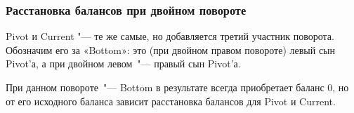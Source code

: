 \begin{frame}
    \frametitle{Расстановка балансов при двойном повороте}

    Pivot и Current "--- те же самые, но добавляется третий участник поворота.
    Обозначим его за «Bottom»: это (при двойном правом повороте) левый сын Pivot'а,
    а при двойном левом "--- правый сын Pivot'а.

    При данном повороте "--- Bottom в результате всегда приобретает баланс $0$,
    но от его исходного баланса зависит расстановка балансов для Pivot и Current.

\end{frame}